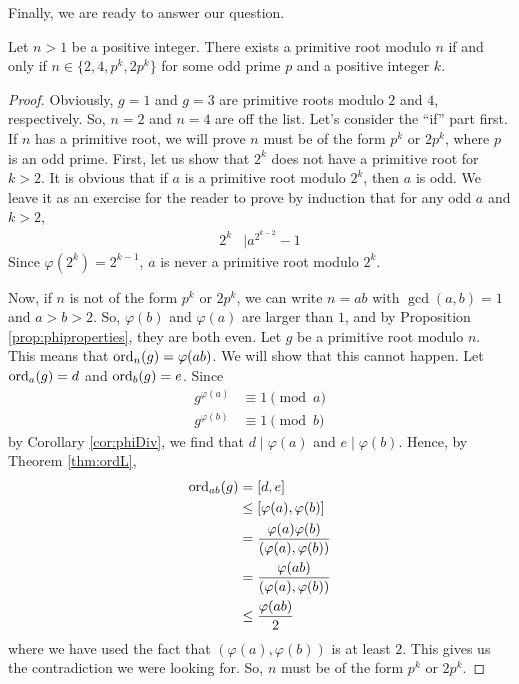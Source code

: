 Finally, we are ready to answer our question.

\begin{theorem}
	Let $n>1$ be a positive integer. There exists a primitive root modulo $n$ if and only if $n\in\{2,4,p^k,2p^k\}$ for some odd prime $p$ and a positive integer $k$.
	\label{thm:pr:wh}
\end{theorem}

\begin{proof}
	Obviously, $g=1$ and $g=3$ are primitive roots modulo $2$ and $4$, respectively. So, $n=2$ and $n=4$ are off the list. Let's consider the ``if'' part first. If $n$ has a primitive root, we will prove $n$ must be of the form $p^k$ or $2p^k$, where $p$ is an odd prime.
	First, let us show that $2^k$ does not have a primitive root for $k >2$. It is obvious that if $a$ is a primitive root modulo $2^k$, then $a$ is odd. We leave it as an exercise for the reader to prove by induction that for any odd $a$ and $k>2$,
		\begin{align*}
			2^k & \mid a^{2^{k-2}}-1
		\end{align*}
	Since $\varphi(2^k)=2^{k-1}$, $a$ is never a primitive root modulo $2^k$.

	Now, if $n$ is not of the form $p^k$ or $2p^k$, we can write $n=ab$ with $\gcd(a,b)=1$ and $a>b>2$. So, $\varphi(b)$ and $\varphi(a)$ are larger than $1$, and by Proposition \ref{prop:phiproperties}, they are both even. Let $g$ be a primitive root modulo $n$. This means that $\operatorname{ord}_{n}(g)=\varphi(ab)$. We will show that this cannot happen. Let $\operatorname{ord}_a(g)=d$ and $\operatorname{ord}_b(g)=e$. Since
		\begin{align*}
			g^{\varphi(a)} & \equiv1\pmod a\\
			g^{\varphi(b)} & \equiv1\pmod b
		\end{align*}
	by Corollary \eqref{cor:phiDiv}, we find that $d \mid \varphi(a)$ and $e\mid \varphi(b)$.
	Hence, by Theorem \eqref{thm:ordL},
		\begin{align*}
			\operatorname{ord}_{ab}(g)
				& =  [d,e]\\
				& \leq [\varphi(a),\varphi(b)]\\
				& = \dfrac{\varphi(a) \varphi(b)}{(\varphi(a), \varphi(b))}\\
				& = \dfrac{\varphi(ab)}{(\varphi(a), \varphi(b))}\\
				& \leq  \dfrac{\varphi(ab)}{2}
		\end{align*}
	where we have used the fact that $(\varphi(a),\varphi(b))$ is at least $2$. This gives us the contradiction we were looking for. So, $n$ must be of the form $p^k$ or $2p^k$.


\end{proof}
